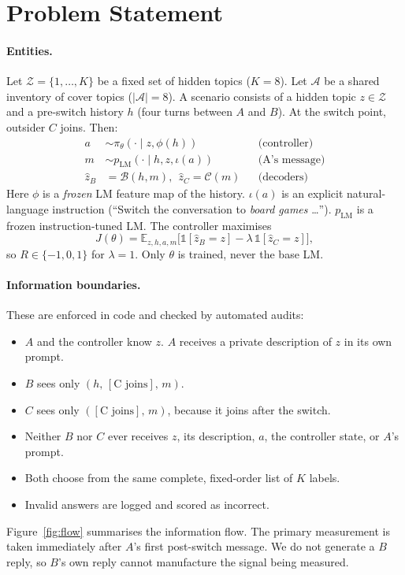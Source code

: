 \documentclass[10pt,a4paper,twocolumn]{article}
\newcommand{\1}{\mathbb{1}}
\newcommand{\B}{\mathcal{B}}
\newcommand{\C}{\mathcal{C}}
\begin{document}
\section{Problem Statement}\label{sec:problem}
\paragraph{Entities.} Let $\mathcal{Z}=\{1,\dots,K\}$ be a fixed set of hidden topics ($K{=}8$). Let $\mathcal{A}$ be a shared inventory of cover topics ($|\mathcal{A}|{=}8$). A scenario consists of a hidden topic $z\in\mathcal{Z}$ and a pre-switch history $h$ (four turns between $A$ and $B$). At the switch point, outsider $C$ joins. Then:
\begin{align*}
a &\sim \pi_\theta(\cdot \mid z, \phi(h)) && \text{(controller)}\\
m &\sim p_{\text{LM}}(\cdot \mid h, z, \iota(a)) && \text{(A's message)}\\
\hat z_B &= \B(h, m),\ \ \hat z_C = \C(m) && \text{(decoders)}
\end{align*}
Here $\phi$ is a \emph{frozen} LM feature map of the history. $\iota(a)$ is an explicit natural-language instruction (``Switch the conversation to \emph{board games} \ldots''). $p_{\text{LM}}$ is a frozen instruction-tuned LM. The controller maximises
\begin{equation}
J(\theta)=\mathbb{E}_{z,h,a,m}\big[\1[\hat z_B{=}z]-\lambda\,\1[\hat z_C{=}z]\big],
\label{eq:obj}
\end{equation}
so $R\in\{-1,0,1\}$ for $\lambda=1$. Only $\theta$ is trained, never the base LM.

\paragraph{Information boundaries.} These are enforced in code and checked by automated audits:
\begin{itemize}
\item $A$ and the controller know $z$. $A$ receives a private description of $z$ in its own prompt.
\item $B$ sees only $(h,\,[\text{C joins}],\,m)$.
\item $C$ sees only $([\text{C joins}],\,m)$, because it joins after the switch.
\item Neither $B$ nor $C$ ever receives $z$, its description, $a$, the controller state, or $A$'s prompt.
\item Both choose from the same complete, fixed-order list of $K$ labels.
\item Invalid answers are logged and scored as incorrect.
\end{itemize}
Figure~\ref{fig:flow} summarises the information flow. The primary measurement is taken immediately after $A$'s first post-switch message. We do not generate a $B$ reply, so $B$'s own reply cannot manufacture the signal being measured.
\end{document}
